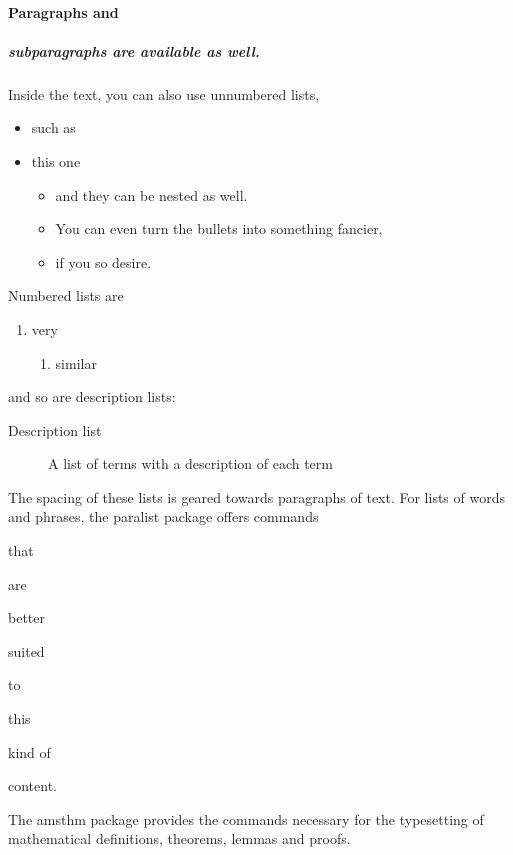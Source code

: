 \documentclass[
  digital,     %
  oneside,     %
  nosansbold,  %
  nocolorbold, %
  lof,         %
  lot,         %
]{fithesis4}
\begin{document}
\paragraph{Paragraphs and}
\subparagraph{subparagraphs are available as well.}
Inside the text, you can also use unnumbered lists,
\begin{itemize}
  \item such as
  \item this one
  \begin{itemize}
    \item     and they can be nested as well.
    \item[>>] You can even turn the bullets into something fancier,
    \item[\S] if you so desire.
  \end{itemize}
\end{itemize}
Numbered lists are
\begin{enumerate}
  \item very
  \begin{enumerate}
    \item similar
  \end{enumerate}
\end{enumerate}
and so are description lists:
\begin{description}
  \item[Description list]
    A list of terms with a description of each term
\end{description}
The spacing of these lists is geared towards paragraphs of text.
For lists of words and phrases, the \textsf{paralist} package
offers commands
\begin{compactitem}
  \item that
  \begin{compactitem}
    \item are
    \begin{compactitem}
      \item better
      \begin{compactitem}
        \item suited
      \end{compactitem}
    \end{compactitem}
  \end{compactitem}
\end{compactitem}
\begin{compactenum}
  \item to
  \begin{compactenum}
    \item this
    \begin{compactenum}
      \item kind of
      \begin{compactenum}
        \item content.
      \end{compactenum}
    \end{compactenum}
  \end{compactenum}
\end{compactenum}
The \textsf{amsthm} package provides the commands necessary for the
typesetting of mathematical definitions, theorems, lemmas and
proofs.
\end{document}
